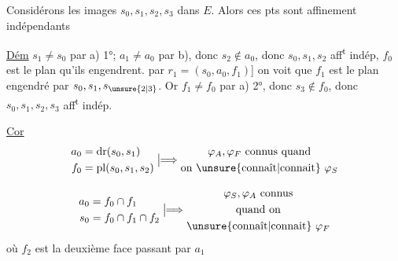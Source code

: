 Considérons les images $s_0,s_1,s_2,s_3$ dans $E$. Alors ces pts sont affinement indépendants

\uline{Dém} $s_1\ne s_0$  par a) 1°; $a_1\ne a_0$ par b), donc $s_2\notin a_0$, donc $s_0,s_1,s_2$ aff\textsuperscript{t} indép, $f_0$ est le plan qu'ils engendrent.  \unsure{(en remplaçant|[remplaçant}  par $r_1=(s_0,a_0,f_1)$] on voit que $f_1$ est le plan engendré par $s_0,s_1,s_{\unsure{2|3}}$. Or $f_1\ne f_0$  par a) 2°, donc $s_3\notin f_0$, donc $s_0,s_1,s_2,s_3$ aff\textsuperscript{t} indép.

\uline{Cor}
\[
\begin{aligned}
a_0&=\mathrm{dr}(s_0,s_1)\\
f_0&=\mathrm{pl}(s_0,s_1,s_2)
\end{aligned}
\mathrel{\big|\!\!\Longrightarrow}
\begin{gathered}
\varphi_A,\varphi_F\ \text{connus quand}\\
\text{on \unsure{connaît|connait} }\varphi_S
\end{gathered}
\]

\[
\begin{aligned}
a_0&=f_0\cap f_1\\
s_0&=f_0\cap f_1\cap f_2
\end{aligned}
\mathrel{\big|\!\!\Longrightarrow}
\begin{gathered}
\varphi_S,\varphi_A\ \text{connus}\\
\text{quand on}\\
\text{\unsure{connaît|connait} }\varphi_F
\end{gathered}
\]
où $f_2$ est la deuxième face passant par $a_1$

